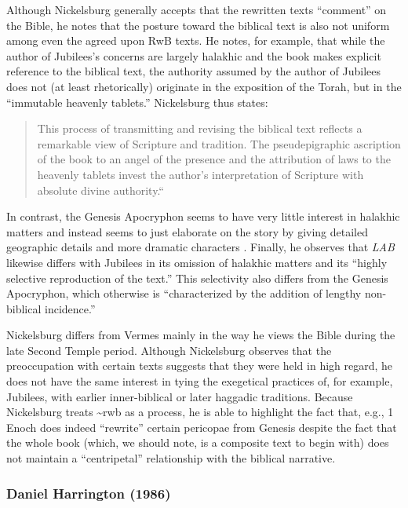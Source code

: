 Although Nickelsburg generally accepts that the rewritten texts
``comment'' on the Bible, he notes that the posture toward the biblical
text is also not uniform among even the agreed upon RwB texts. He notes,
for example, that while the author of Jubilees's concerns are largely
halakhic and the book makes explicit reference to the biblical text, the
authority assumed by the author of Jubilees does not (at least
rhetorically) originate in the exposition of the Torah, but in the
``immutable heavenly
tablets.''\autocite[100--101]{nickelsburg_stone1984} Nickelsburg thus
states:

\begin{quote}
This process of transmitting and revising the biblical text reflects a
remarkable view of Scripture and tradition. The pseudepigraphic
ascription of the book to an angel of the presence and the attribution
of laws to the heavenly tablets invest the author's interpretation of
Scripture with absolute divine
authority.``\autocite[101]{nickelsburg_stone1984}
\end{quote}

In contrast, the Genesis Apocryphon seems to have very little interest
in halakhic matters and instead seems to just elaborate on the story by
giving detailed geographic details and more dramatic characters
\autocite[106]{nickelsburg_stone1984}. Finally, he observes that
\emph{LAB} likewise differs with Jubilees in its omission of halakhic
matters and its ``highly selective reproduction of the
text.''\autocite[110]{nickelsburg_stone1984} This selectivity also
differs from the Genesis Apocryphon, which otherwise is ``characterized
by the addition of lengthy non-biblical
incidence.''\autocite[110]{nickelsburg_stone1984}

Nickelsburg differs from Vermes mainly in the way he views the Bible
during the late Second Temple period. Although Nickelsburg observes that
the preoccupation with certain texts suggests that they were held in
high regard, he does not have the same interest in tying the exegetical
practices of, for example, Jubilees, with earlier inner-biblical or
later haggadic traditions. Because Nickelsburg treats
\textasciitilde{}rwb as a process, he is able to highlight the fact
that, e.g., 1 Enoch does indeed ``rewrite'' certain pericopae from
Genesis despite the fact that the whole book (which, we should note, is
a composite text to begin with) does not maintain a ``centripetal''
relationship with the biblical narrative.

\subsubsection{Daniel Harrington (1986)}\label{daniel-harrington-1986}

